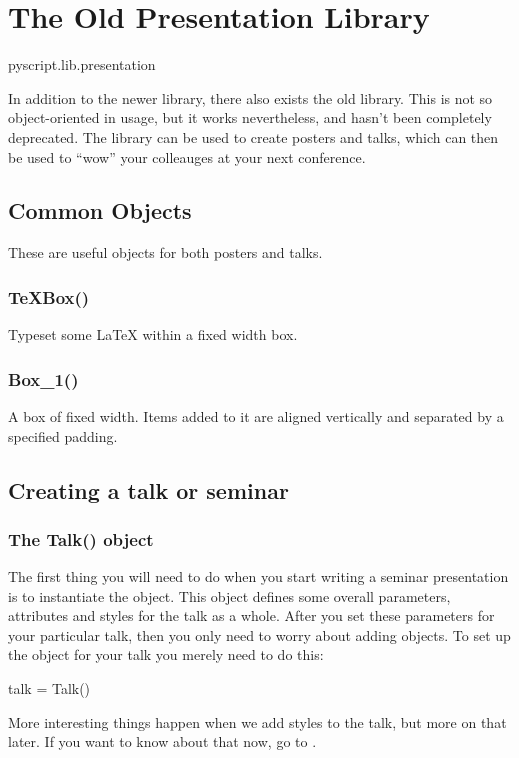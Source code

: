 \chapter{The Old Presentation Library}

\begin{python}
pyscript.lib.presentation
\end{python}

In addition to the newer  library, there also
exists the old  library.  This is not so
object-oriented in usage, but it works nevertheless, and hasn't been
completely deprecated.  The  library can be used to create
posters and talks, which can then be used to ``wow'' your colleauges at your
next conference.

\section{Common Objects}

These are useful objects for both posters and talks.

\subsection{TeXBox()}

Typeset some \LaTeX{} within a fixed width box.

\subsection{Box\_1()}

A box of fixed width.  Items added to it are aligned vertically and
separated by a specified padding.

\section{Creating a talk or seminar}

\subsection{The Talk() object}

The first thing you will need to do when you start writing a seminar
presentation is to instantiate the  object.  This object defines
some overall parameters, attributes and styles for the talk as a whole.
After you set these parameters for your particular talk, then you only need
to worry about adding  objects.  To set up the 
object for your talk you merely need to do this:
\begin{python}
talk = Talk()
\end{python}
More interesting things happen when we add styles to the talk, but more on
that later.  If you want to know about that now, go to .

